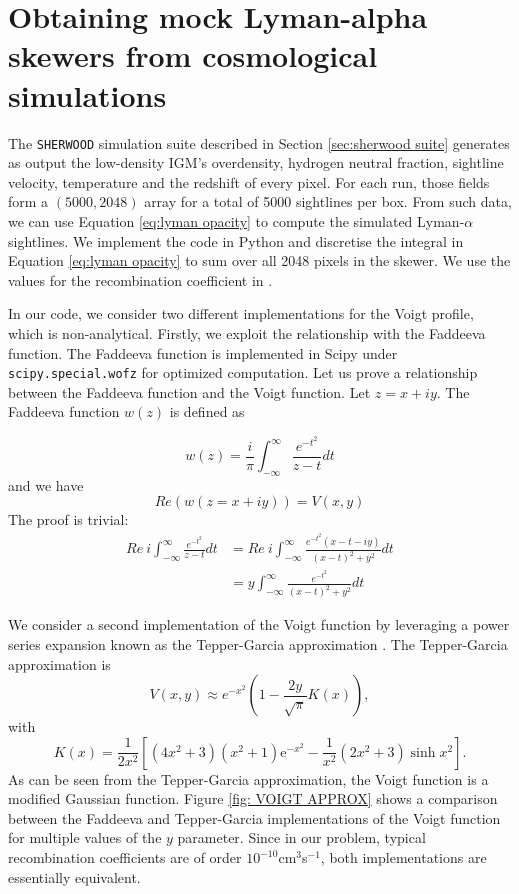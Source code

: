 \section{Obtaining mock Lyman-alpha skewers from cosmological simulations}
The \texttt{SHERWOOD} simulation suite described in Section \ref{sec:sherwood suite} generates as output the low-density IGM's overdensity, hydrogen neutral fraction, sightline velocity, temperature and the redshift of every pixel. For each run, those fields form a $(5000, 2048)$ array for a total of 5000 sightlines per box. From such data, we can use Equation \ref{eq:lyman opacity} to compute the simulated Lyman-$\alpha$ sightlines. We implement the code in Python and discretise the integral in Equation \ref{eq:lyman opacity} to sum over all 2048 pixels in the skewer. We use the values for the recombination coefficient in \cite{Luki__2014}.

In our code, we consider two different implementations for the Voigt profile, which is non-analytical. Firstly, we exploit the relationship with the Faddeeva function. The Faddeeva function is implemented in Scipy under \texttt{scipy.special.wofz} for optimized computation. Let us prove a relationship between the Faddeeva function and the Voigt function. Let $z=x+iy$.
The Faddeeva function $w(z)$ is defined as

\begin{equation}
    w(z)=\frac{i}{\pi} \int_{-\infty}^{\infty} \frac{e^{-t^2}}{z-t}dt
\end{equation}
and we have 
\begin{equation}\label{eq:FAD}
    Re \left( w(z=x+iy) \right)=V(x,y)
\end{equation}
The proof is trivial:
\begin{equation}
    \begin{split}
        Re\ i \int_{-\infty}^{\infty} \frac{e^{-t^2}}{z-t}dt
        &= Re\ i \int_{-\infty}^{\infty} \frac{e^{-t^2} (x-t-iy)}{(x-t)^2+y^2}dt\\
        &=y\int_{-\infty}^{\infty} \frac{e^{-t^2}}{(x-t)^2+y^2}dt
    \end{split}
\end{equation}

We consider a second implementation of the Voigt function by leveraging a power series expansion known as the Tepper-Garcia approximation \cite{Tepper_Garc_a_2006}. The Tepper-Garcia approximation is
\begin{equation}\label{eq:Tepper}
        V(x,y)\approx e^{-x^2}\left( 1-\frac{2y}{\sqrt{\pi}} K(x) \right),
\end{equation}
with
\begin{equation}
        K(x)=\frac1{2x^2}\left[(4x^2+3)\left(x^2+1\right)\mathrm{e}^{-x^2}-\frac1{x^2}(2x^2+3)\sinh x^2\right].
\end{equation}
As can be seen from the Tepper-Garcia approximation, the Voigt function is a modified Gaussian function. Figure \ref{fig: VOIGT APPROX} shows a comparison between the Faddeeva and Tepper-Garcia implementations of the Voigt function for multiple values of the $y$ parameter. Since in our problem, typical recombination coefficients are of order $10^{-10}$cm$^3$s$^{-1}$, both implementations are essentially equivalent.

